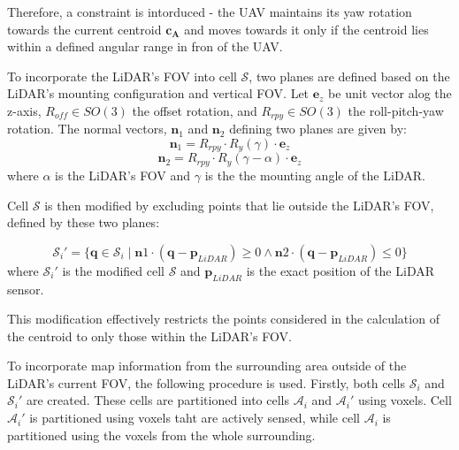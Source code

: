             Therefore, a constraint is intorduced - the \ac{UAV} maintains its yaw rotation towards the current centroid $\mathbf{c}_{\mathbf{A}}$ and moves towards it only if the centroid lies within a defined angular range in fron of the \ac{UAV}.

            To incorporate the \ac{LiDAR}'s \ac{FOV} into cell $\mathcal{S}$, two planes are defined based on the \ac{LiDAR}'s mounting configuration and vertical \ac{FOV}.
            Let $\mathbf{e}_z$ be unit vector alog the z-axis, $R_{off} \in SO(3)$ the offset rotation, and $R_{rpy} \in SO(3)$ the roll-pitch-yaw rotation.
            The normal vectors, $\mathbf{n}_1$ and $\mathbf{n}_2$ defining two planes are given by:
            \begin{equation}
                \mathbf{n}_1 = R_{rpy} \cdot R_{y}(\gamma) \cdot \mathbf{e}_z    
            \end{equation}
            \begin{equation}
                \mathbf{n}_2 = R_{rpy} \cdot R_{y}(\gamma - \alpha) \cdot \mathbf{e}_z    
            \end{equation}
            where $\alpha$ is the \ac{LiDAR}'s \ac{FOV} and $\gamma$ is the the mounting angle of the \ac{LiDAR}.

            Cell $\mathcal{S}$ is then modified by excluding points that lie outside the \ac{LiDAR}'s \ac{FOV}, defined by these two planes: 

            \begin{equation}
                \mathcal{S}_i' = \{ \mathbf{q} \in \mathcal{S}_i \mid \mathbf{n}1 \cdot (\mathbf{q} - \mathbf{p}_{LiDAR}) \geq 0 \land \mathbf{n}2 \cdot (\mathbf{q} - \mathbf{p}_{LiDAR}) \leq 0 \}
            \end{equation}
            where $\mathcal{S}_i'$ is the modified cell $\mathcal{S}$ and $\mathbf{p}_{LiDAR}$ is the exact position of the LiDAR sensor.

            This modification effectively restricts the points considered in the calculation of the centroid to only those within the \ac{LiDAR}'s \ac{FOV}.

            To incorporate map information from the surrounding area outside of the \ac{LiDAR}'s current \ac{FOV}, the following procedure is used.
            Firstly, both cells $\mathcal{S}_i$ and $\mathcal{S}_i'$ are created. These cells are partitioned into cells $\mathcal{A}_i$ and $\mathcal{A}_i'$ using voxels. 
            Cell $\mathcal{A}_i'$ is partitioned using voxels taht are actively sensed, while cell $\mathcal{A}_i$ is partitioned using the voxels from the whole surrounding.

